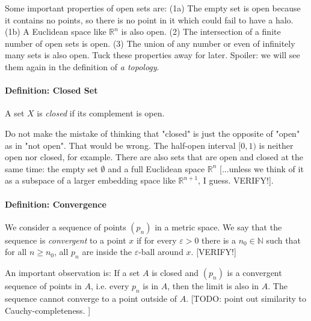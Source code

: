 \medskip
Some important properties of open sets are: (1a) The empty set is open because it contains no points, so there is no point in it which could fail to have a halo. (1b) A Euclidean space like $\mathbb{R}^n$ is also open. (2) The intersection of a finite number of open sets is open. (3) The union of any number or even of infinitely many sets is also open. Tuck these properties away for later. Spoiler: we will see them again in the definition of \emph{a topology}.


\paragraph{Definition: Closed Set} A set $X$ is \emph{closed} if its complement is open.

\medskip
Do not make the mistake of thinking that "closed" is just the opposite of "open" as in "not open". That would be wrong. The half-open interval $[0,1)$ is neither open nor closed, for example. There are also sets that are open and closed at the same time: the empty set $\emptyset$ and a full Euclidean space $\mathbb{R}^n$ [...unless we think of it as a subspace of a larger embedding space like $\mathbb{R}^{n+1}$, I guess. VERIFY!]. 



\paragraph{Definition: Convergence} We consider a sequence of points $(p_n)$ in a metric space. We say that the sequence is \emph{convergent} to a point $x$ if for every $\varepsilon > 0$ there is a $n_0 \in \mathbb{N}$ such that for all $n \geq n_0$, all $p_n$ are inside the $\varepsilon$-ball around $x$. [VERIFY!]

\medskip
An important observation is: If a set $A$ is closed and $(p_n)$ is a convergent sequence of points in $A$, i.e. every $p_n$ is in $A$, then the limit is also in $A$. The sequence cannot converge to a point outside of $A$. [TODO: point out similarity to Cauchy-completeness. ]


